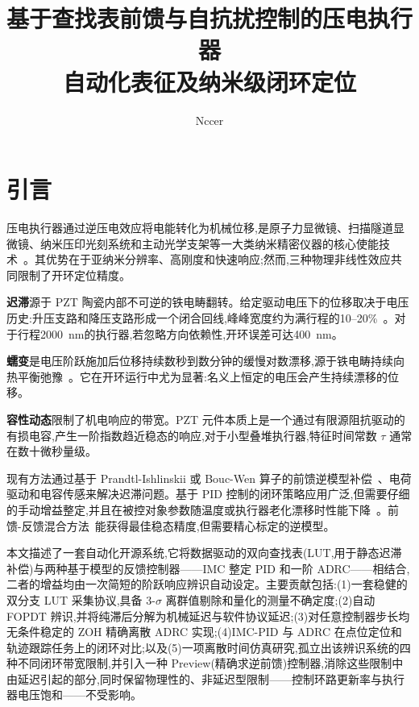 \documentclass[fleqn,10pt]{wlscirep}
\title{基于查找表前馈与自抗扰控制的压电执行器\\
自动化表征及纳米级闭环定位}
\author[1,*]{Nccer}
\affil[1]{精密工程系}
\affil[*]{chanccer@gmail.com}
\begin{document}
\flushbottom
\maketitle
\thispagestyle{empty}

\section*{引言}

压电执行器通过逆压电效应将电能转化为机械位移,是原子力显微镜、扫描隧道显微镜、纳米压印光刻系统和主动光学支架等一大类纳米精密仪器的核心使能技术~\cite{devasia2007review,adriaens2000piezo}。其优势在于亚纳米分辨率、高刚度和快速响应;然而,三种物理非线性效应共同限制了开环定位精度。

\textbf{迟滞}源于 PZT 陶瓷内部不可逆的铁电畴翻转。给定驱动电压下的位移取决于电压历史:升压支路和降压支路形成一个闭合回线,峰峰宽度约为满行程的10--20\%~\cite{gu2016survey}。对于行程\SI{2000}{nm}的执行器,若忽略方向依赖性,开环误差可达\SI{400}{nm}。

\textbf{蠕变}是电压阶跃施加后位移持续数秒到数分钟的缓慢对数漂移,源于铁电畴持续向热平衡弛豫~\cite{croft2001creep}。它在开环运行中尤为显著:名义上恒定的电压会产生持续漂移的位移。

\textbf{容性动态}限制了机电响应的带宽。PZT 元件本质上是一个通过有限源阻抗驱动的有损电容,产生一阶指数趋近稳态的响应,对于小型叠堆执行器,特征时间常数 $\tau$ 通常在数十微秒量级。

现有方法通过基于 Prandtl-Ishlinskii 或 Bouc-Wen 算子的前馈逆模型补偿~\cite{xie2017piezo}、电荷驱动和电容传感来解决迟滞问题。基于 PID 控制的闭环策略应用广泛,但需要仔细的手动增益整定,并且在被控对象参数随温度或执行器老化漂移时性能下降~\cite{ang2005pid}。前馈-反馈混合方法~\cite{leang2009feedforward}能获得最佳稳态精度,但需要精心标定的逆模型。

本文描述了一套自动化开源系统,它将数据驱动的双向查找表(LUT,用于静态迟滞补偿)与两种基于模型的反馈控制器——IMC 整定 PID 和一阶 ADRC——相结合,二者的增益均由一次简短的阶跃响应辨识自动设定。主要贡献包括:(1)一套稳健的双分支 LUT 采集协议,具备 3-$\sigma$ 离群值剔除和量化的测量不确定度;(2)自动 FOPDT 辨识,并将纯滞后分解为机械延迟与软件协议延迟;(3)对任意控制器步长均无条件稳定的 ZOH 精确离散 ADRC 实现;(4)IMC-PID 与 ADRC 在点位定位和轨迹跟踪任务上的闭环对比;以及(5)一项离散时间仿真研究,孤立出该辨识系统的四种不同闭环带宽限制,并引入一种 Preview(精确求逆前馈)控制器,消除这些限制中由延迟引起的部分,同时保留物理性的、非延迟型限制——控制环路更新率与执行器电压饱和——不受影响。
\end{document}
